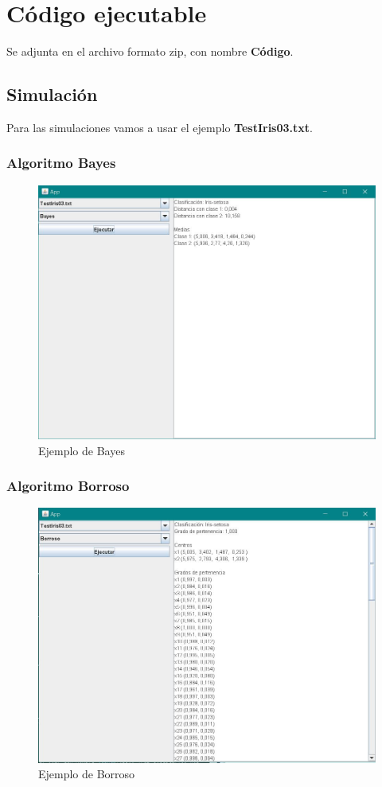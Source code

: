 \documentclass[12pt]{article}
\begin{document}
\section{Código ejecutable}
Se adjunta en el archivo formato zip, con nombre\textbf{ Código}.
\subsection{Simulación}
Para las simulaciones vamos a usar el ejemplo \textbf{TestIris03.txt}.
\subsubsection{Algoritmo Bayes}
\begin{figure}[H]
    \centering
    \includegraphics[width=1\textwidth]{bayes.JPG}
    \caption{Ejemplo de Bayes}
\end{figure}
\subsubsection{Algoritmo Borroso}
\begin{figure}[H]
    \centering
    \includegraphics[width=1\textwidth]{borroso.JPG}
    \caption{Ejemplo de Borroso}
\end{figure}
\end{document}
